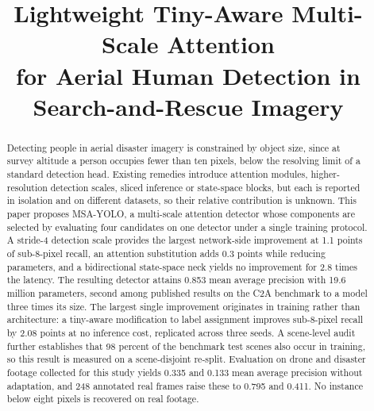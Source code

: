 \documentclass[conference,a4paper]{IEEEtran}
\begin{document}
\title{Lightweight Tiny-Aware Multi-Scale Attention\\
for Aerial Human Detection in\\
Search-and-Rescue Imagery}

\author{
}

\maketitle

\begin{abstract}
Detecting people in aerial disaster imagery is constrained by object size, since
at survey altitude a person occupies fewer than ten pixels, below the resolving
limit of a standard detection head. Existing remedies introduce attention
modules, higher-resolution detection scales, sliced inference or state-space
blocks, but each is reported in isolation and on different datasets, so their
relative contribution is unknown. This paper proposes MSA-YOLO, a multi-scale
attention detector whose components are selected by evaluating four candidates
on one detector under a single training protocol. A stride-4 detection scale
provides the largest network-side improvement at 1.1 points of sub-8-pixel
recall, an attention substitution adds 0.3 points while reducing parameters,
and a bidirectional state-space neck yields no improvement for 2.8 times the
latency. The resulting detector attains 0.853 mean average precision with 19.6
million parameters, second among published results on the C2A benchmark to a
model three times its size. The largest single improvement originates in
training rather than architecture: a tiny-aware modification to label
assignment improves sub-8-pixel recall by 2.08 points at no inference cost,
replicated across three seeds. A scene-level audit further establishes that 98
percent of the benchmark test scenes also occur in training, so this result is
measured on a scene-disjoint re-split. Evaluation on drone and disaster footage
collected for this study yields 0.335 and 0.133 mean average precision without
adaptation, and 248 annotated real frames raise these to 0.795 and 0.411. No
instance below eight pixels is recovered on real footage.
\end{abstract}
\end{document}
